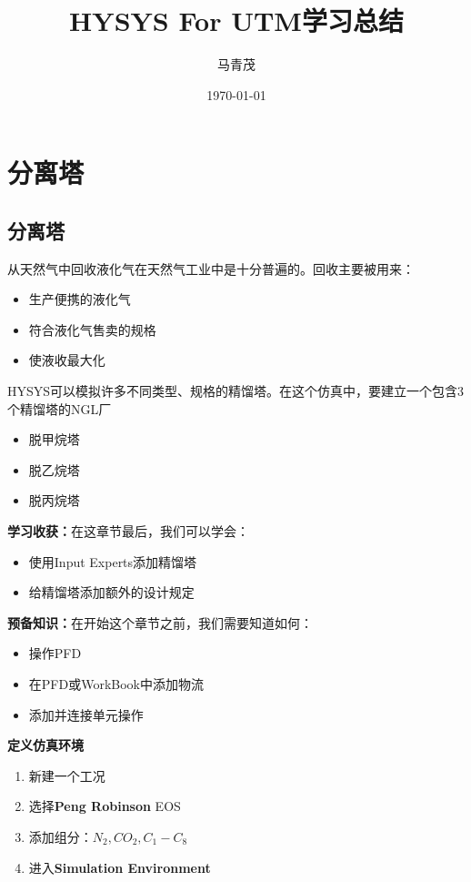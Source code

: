 \documentclass[UTF8]{ctexart}
\title{HYSYS For UTM学习总结}
\author{马青茂}
\date{\today}
\begin{document}
\maketitle

\newpage

\tableofcontents

\newpage

\section{分离塔}

\subsection{分离塔}
从天然气中回收液化气在天然气工业中是十分普遍的。回收主要被用来：
\begin{itemize}
	\item 生产便携的液化气
	\item 符合液化气售卖的规格
	\item 使液收最大化
\end{itemize}
HYSYS可以模拟许多不同类型、规格的精馏塔。在这个仿真中，要建立一个包含3个精馏塔的NGL厂
\begin{itemize}
	\item 脱甲烷塔
	\item 脱乙烷塔
	\item 脱丙烷塔
\end{itemize}
\textbf{学习收获：}在这章节最后，我们可以学会：
\begin{itemize}
	\item 使用Input Experts添加精馏塔
	\item 给精馏塔添加额外的设计规定
\end{itemize}
\textbf{预备知识：}在开始这个章节之前，我们需要知道如何：
\begin{itemize}
	\item 操作PFD
	\item 在PFD或WorkBook中添加物流
	\item 添加并连接单元操作
\end{itemize}
\textbf{定义仿真环境}
\begin{enumerate}	
	\item 新建一个工况
	\item 选择\textbf{Peng Robinson} EOS
	\item 添加组分：$N_2,CO_2,C_1-C_8$
	\item 进入\textbf{Simulation Environment}
\end{enumerate}
\end{document}
